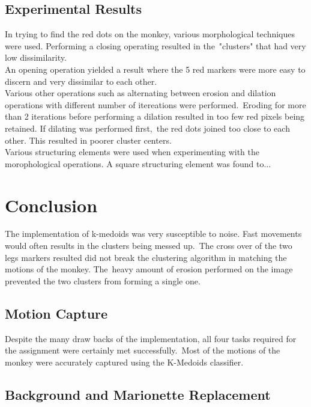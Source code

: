 \documentclass[12pt,a4paper]{article}
\begin{document}
      \subsection{Experimental Results}
      In trying to find the red dots on the monkey, various morphological techniques were used. Performing a closing operating resulted in the\
      "clusters" that had very low dissimilarity.\\

      An opening operation yielded a result where the 5 red markers were more easy to discern and very dissimilar to each other.\\

      Various other operations such as alternating between erosion and dilation operations with different number of itereations were performed.\
      Eroding for more than 2 iterations before performing a dilation resulted in too few red pixels being retained. If dilating was performed first,\
      the red dots joined too close to each other. This resulted in poorer cluster centers.\\

      Various structuring elements were used when experimenting with the morophological operations. A square structuring element was found to...

    \section{Conclusion}

    The implementation of k-medoids was very susceptible to noise. Fast movements would often results in the clusters being messed up.\
    The cross over of the two legs markers resulted did not break the clustering algorithm in matching the motions of the monkey. The\
    heavy amount of erosion performed on the image prevented the two clusters from forming a single one.

      \subsection{Motion Capture}

      Despite the many draw backs of the implementation, all four tasks required for the assignment were certainly met successfully.\
      Most of the motions of the monkey were accurately captured using the K-Medoids classifier.

      \subsection{Background and Marionette Replacement}
\end{document}
